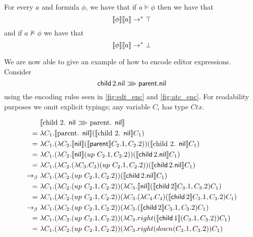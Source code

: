 \documentclass[sigplan,screen]{acmart}
\begin{document}
\begin{lemma}
  For every \abt $a$ and formula $\phi$, we have that if $a \models
  \phi$ then we have that
  \begin{equation}
    \label{eq:true}
    \llbracket \phi \rrbracket \llbracket a \rrbracket \rightarrow^{*} \top
  \end{equation}
  and if $a \not\models \phi$ we have that
  \begin{equation}
    \label{eq:false}
        \llbracket \phi \rrbracket \llbracket a \rrbracket \rightarrow^{*} \bot
  \end{equation}
\end{lemma}

\begin{example}
    We are now able to give an example of how to encode editor
    expressions. Consider
    \begin{equation*}
       \textsf{child}\, 2.\textsf{nil} \ggg \textsf{parent} .\textsf{nil}
    \end{equation*}
    using the encoding rules seen in \cref{fig:edt_enc} and
    \cref{fig:atc_enc}. For readability purposes we omit explicit
    typings;  any variable $C_i$ has type $Ctx$.
    \begin{small}
    \begin{align*}
      &\ \encode{\text{child\ $2$. \nil  $\ggg$ parent. \nil }} \\
         =&\ \lambda C_1 . \encode{\text{parent. \nil }} (\encode{\text{child\ $2$. \nil }} C_1) \\
         =&\ \lambda C_1 . (\lambda C_2 . \encode{\nil }(\encode{\parnt} C_2.1, C_2.2)) (\encode{\text{child\ $2$. \nil }} C_1) \\
         =&\ \lambda C_1 . (\lambda C_2 . \encode{\nil}(up\ C_2.1,
            C_2.2)) (\encode{\chld  2. \nil} C_1) \\
         =&\ \lambda C_1 . (\lambda C_2 . (\lambda C_3 . C_3)(up\ C_2.1, C_2.2)) (\encode{\chld  2. \nil } C_1) \\
         \betar&\ \lambda C_1 . (\lambda C_2 . (up\ C_2.1, C_2.2)) (\encode{\chld  2. \nil } C_1) \\
         =&\ \lambda C_1 . (\lambda C_2 . (up\ C_2.1, C_2.2)) (\lambda
            C_3 . \encode{ \nil} (\encode{\chld  2} C_3.1, C_3.2)C_1) \\
         =&\ \lambda C_1 . (\lambda C_2 . (up\ C_2.1, C_2.2)) (\lambda C_3 . (\lambda C_4.C_4) (\encode{\chld  2} C_3.1, C_3.2)C_1) \\
         \betar&\ \lambda C_1 . (\lambda C_2 . (up\ C_2.1, C_2.2)) (\lambda C_3 . (\encode{\chld  2} C_3.1, C_3.2)C_1) \\
         =&\ \lambda C_1 . (\lambda C_2 . (up\ C_2.1, C_2.2)) (\lambda C_3 . right (\encode{\chld  1} (C_3.1, C_3.2))C_1) \\
         =&\ \lambda C_1 . (\lambda C_2 . (up\ C_2.1, C_2.2)) (\lambda C_3 . right (down (C_3.1, C_3.2))C_1) \\
    \end{align*}
    \end{small}
\end{example}
\end{document}
